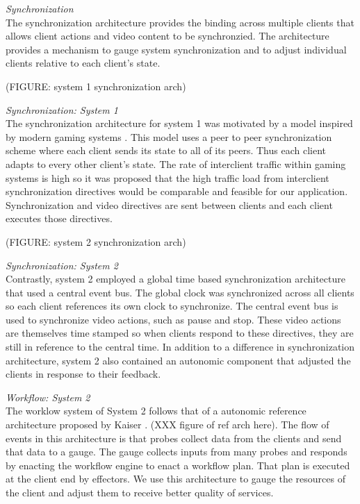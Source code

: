 \documentclass[10pt]{article}
\begin{document}
\textit{Synchronization}  \\
The synchronization architecture provides the binding across multiple
clients that allows client actions and video content to be
synchronzied.  The architecture provides a mechanism to gauge system
synchronization and to adjust individual clients relative to each
client's state.

(FIGURE: system 1 synchronization arch)

\textit{Synchronization: System 1}  \\
The synchronization architecture for system 1 was motivated by a model
inspired by modern gaming systems \citep{???}.  This model uses a peer
to peer synchronization scheme where each client sends its state to
all of its peers.  Thus each client adapts to every other client's
state.  The rate of interclient traffic within gaming systems is high
so it was proposed that the high traffic load from interclient
synchronization directives would be comparable and feasible for our
application.  Synchronization and video directives are sent between
clients and each client executes those directives.

(FIGURE: system 2 synchronization arch)

\textit{Synchronization: System 2}  \\
Contrastly, system 2 employed a global time based synchronization
architecture that used a central event bus.  The global clock was
synchronized across all clients so each client references its own
clock to synchronize.  The central event bus is used to synchronize
video actions, such as pause and stop.  These video actions are
themselves time stamped so when clients respond to these directives,
they are still in reference to the central time.  In addition to a
difference in synchronization architecture, system 2 also contained an
autonomic component that adjusted the clients in response to their
feedback.

\textit{Workflow: System 2}  \\
The worklow system of System 2 follows that of a autonomic reference
architecture proposed by Kaiser \cite{refarch}.  (XXX figure of ref
arch here).  The flow of events in this architecture is that probes
collect data from the clients and send that data to a gauge.  The
gauge collects inputs from many probes and responds by enacting the
workflow engine to enact a workflow plan.  That plan is executed at
the client end by effectors.  We use this architecture to gauge the
resources of the client and adjust them to receive better quality of
services.
\end{document}

